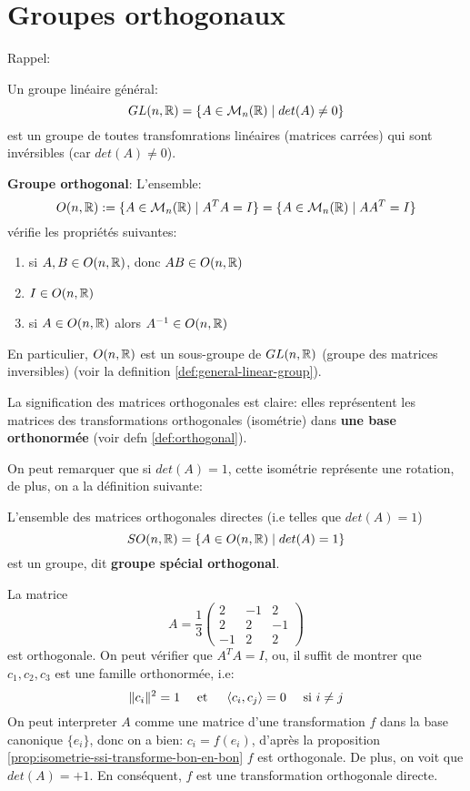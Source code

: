 \section{Groupes orthogonaux}
Rappel:
\begin{definition}\label{def:general-linear-group}
    Un groupe linéaire général:
    \[
        GL(n, \mathbb{R}) = \{A \in \mathcal{M}_{n}(\mathbb{R}) \mid det(A) \neq 0\}
    \] 
    est un groupe de toutes transfomrations linéaires (matrices carrées) qui sont invérsibles (car $det(A) \neq 0$).
\end{definition}

\begin{definition} \textbf{Groupe orthogonal}:
    L'ensemble:
    \[
        O(n, \mathbb{R}) := \{A \in \mathcal{M}_{n}(\mathbb{R}) \mid A^TA = I\} = \{A \in \mathcal{M}_{n}(\mathbb{R}) \mid AA^T = I\}
    \] 
    vérifie les propriétés suivantes:
    \begin{enumerate}
        \item si $A, B \in O(n, \mathbb{R})$, donc $AB \in O(n, \mathbb{R})$
        \item $I \in O(n, \mathbb{R})$
        \item si $A \in O(n, \mathbb{R})$ alors $A^{-1} \in O(n, \mathbb{R})$
    \end{enumerate}
    En particulier, $O(n, \mathbb{R})$ est un sous-groupe de $GL(n, \mathbb{R})$ (groupe des matrices inversibles) (voir la definition \ref{def:general-linear-group}).
\end{definition}
\begin{intuition}
    La signification des matrices orthogonales est claire: elles représentent les matrices des transformations orthogonales (isométrie) dans \textbf{une base orthonormée} (voir defn \ref{def:orthogonal}). 
\end{intuition}
On peut remarquer que si $det(A) = 1$, cette isométrie représente une rotation, de plus, on a la définition suivante:
 \begin{definition}
    L'ensemble des matrices orthogonales directes (i.e telles que $det(A) = 1$)
    \[
    SO(n, \mathbb{R}) = \{A \in O(n, \mathbb{R}) \mid det(A) = 1 \}
    \] 
    est un groupe, dit  \textbf{groupe spécial orthogonal}.
\end{definition}
\begin{eg}
   La matrice
   \[
       A = \frac{1}{3} \begin{pmatrix} 2 & -1 & 2\\ 2 & 2 & -1\\ -1 & 2 & 2 \end{pmatrix} 
   \] 
   est orthogonale. On peut vérifier que $A^TA = I$, ou, il suffit de montrer que  $c_1, c_2, c_3$ est une famille orthonormée, i.e:
   \[
       \|c_i\|^2 = 1 \quad \text{ et } \quad \left\langle c_i, c_j \right\rangle = 0 \quad \text{ si } i \neq j
   \] 
   On peut interpreter $A$ comme une matrice d'une transformation $f$ dans la base canonique $\{e_i\}$, donc on a bien:  $c_i = f(e_i)$, d'après la proposition \ref{prop:isometrie-ssi-transforme-bon-en-bon} $f$ est orthogonale. De plus, on voit que  $det(A) = +1$. En conséquent,  $f$ est une transformation orthogonale directe.
\end{eg}
